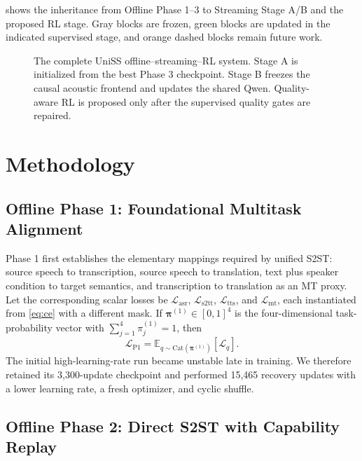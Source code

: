 \documentclass[11pt,a4paper]{article}
\newcommand{\vect}[1]{\bm{#1}}
\newcommand{\Loss}{\mathcal{L}}
\newcommand{\E}{\mathbb{E}}
\begin{document}
 shows the inheritance from Offline Phase 1--3 to Streaming Stage A/B and the proposed RL stage. Gray blocks are frozen, green blocks are updated in the indicated supervised stage, and orange dashed blocks remain future work.

\begin{figure}[htbp]
  \centering
  \resizebox{\textwidth}{!}{}
  \caption{The complete UniSS offline--streaming--RL system. Stage A is initialized from the best Phase 3 checkpoint. Stage B freezes the causal acoustic frontend and updates the shared Qwen. Quality-aware RL is proposed only after the supervised quality gates are repaired.}
  \label{fig:architecture}
\end{figure}

\section{Methodology}

\subsection{Offline Phase 1: Foundational Multitask Alignment}

Phase 1 first establishes the elementary mappings required by unified S2ST: source speech to transcription, source speech to translation, text plus speaker condition to target semantics, and transcription to translation as an MT proxy. Let the corresponding scalar losses be $\Loss_{\mathrm{asr}}$, $\Loss_{\mathrm{s2tt}}$, $\Loss_{\mathrm{tts}}$, and $\Loss_{\mathrm{mt}}$, each instantiated from \cref{eq:ce} with a different mask. If $\vect{\pi}^{(1)}\in[0,1]^4$ is the four-dimensional task-probability vector with $\sum_{j=1}^{4}\pi_j^{(1)}=1$, then
\begin{equation}
 \Loss_{\mathrm{P1}}
 =\E_{q\sim\mathrm{Cat}(\vect{\pi}^{(1)})}
 \left[\Loss_q\right].
 \label{eq:p1}
\end{equation}
The initial high-learning-rate run became unstable late in training. We therefore retained its 3,300-update checkpoint and performed 15,465 recovery updates with a lower learning rate, a fresh optimizer, and cyclic shuffle.

\subsection{Offline Phase 2: Direct S2ST with Capability Replay}
\end{document}

